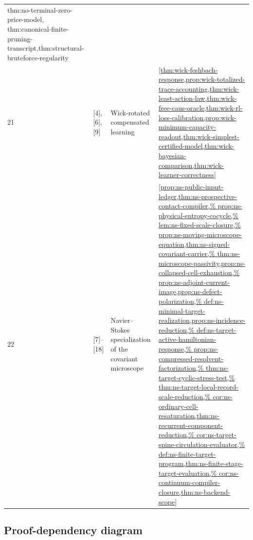 \documentclass[11pt]{article}
\numberwithin{section}{part}
\theoremstyle{plain}
\theoremstyle{definition}
\theoremstyle{remark}
\begin{document}
\begin{longtable}{p{.055\linewidth}p{.105\linewidth}p{.30\linewidth}p{.43\linewidth}}
{thm:no-terminal-zero-price-model,%
thm:canonical-finite-pruning-transcript,thm:structural-bruteforce-regularity}\\
21 & [4], [6], [9] & Wick-rotated compensated learning &
\cref{thm:wick-feshbach-response,prop:wick-totalized-trace-accounting,thm:wick-least-action-law,thm:wick-free-caus-oracle,thm:wick-rl-loss-calibration,prop:wick-minimum-capacity-readout,thm:wick-simplest-certified-model,thm:wick-bayesian-comparison,thm:wick-learner-correctness}\\
22 & [7]--[18] & Navier--Stokes specialization of the covariant microscope &
\cref{prop:ns-public-input-ledger,thm:ns-prospective-contact-compiler,%
prop:ns-physical-entropy-cocycle,%
lem:ns-fixed-scale-closure,%
prop:ns-moving-microscope-equation,thm:ns-signed-covariant-carrier,%
thm:ns-microscope-passivity,prop:ns-collapsed-cell-exhaustion,%
prop:ns-adjoint-current-image,prop:ns-defect-polarization,%
def:ns-minimal-target-realization,prop:ns-incidence-reduction,%
def:ns-target-active-hamiltonian-response,%
prop:ns-compressed-resolvent-factorization,%
thm:ns-target-cyclic-stress-test,%
thm:ns-target-local-record-scale-reduction,%
cor:ns-ordinary-cell-resaturation,thm:ns-recurrent-component-reduction,%
cor:ns-target-spine-circulation-evaluator,%
def:ns-finite-target-program,thm:ns-finite-stage-target-evaluation,%
cor:ns-continuum-compiler-closure,thm:ns-backend-scope}\\
\bottomrule
\end{longtable}

\subsection*{Proof-dependency diagram}
\end{document}
